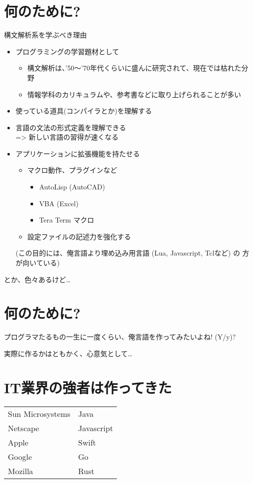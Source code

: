 \documentclass[slide,papersize,fleqn,22pt]{jsarticle}
\begin{document}
\section{何のために?}
\small
構文解析系を学ぶべき理由
\begin{itemize}
\item プログラミングの学習題材として
  \begin{itemize}
  \item 構文解析は、'50〜'70年代くらいに盛んに研究されて、現在では枯れた分野
  \item 情報学科のカリキュラムや、参考書などに取り上げられることが多い
  \end{itemize}
\item 使っている道具(コンパイラとか)を理解する 
\item 言語の文法の形式定義を理解できる \\
  => 新しい言語の習得が速くなる
\item アプリケーションに拡張機能を持たせる
  \begin{itemize}
  \item マクロ動作、プラグインなど \\
    \begin{itemize}
      \item AutoLisp (AutoCAD)
      \item VBA (Excel)
      \item Tera Term マクロ
    \end{itemize}
  \item 設定ファイルの記述力を強化する
  \end{itemize}
  {\tiny (この目的には、俺言語より埋め込み用言語 (Lua, Javascript, Tclなど) の
  方が向いている)}
\end{itemize}
とか、色々あるけど…
\section{何のために?}
\begin{tcolorbox}
  \Large
  プログラマたるもの一生に一度くらい、俺言語を作ってみたいよね! (Y/y)?
\end{tcolorbox}
\begin{flushright}
実際に作るかはともかく、心意気として…
\end{flushright}
\section{IT業界の強者は作ってきた}
\begin{tabular}{ll}
  Sun Microsystems & Java \\
  Netscape & Javascript \\
  Apple & Swift \\
  Google & Go \\
  Mozilla & Rust
\end{tabular}
\end{document}
